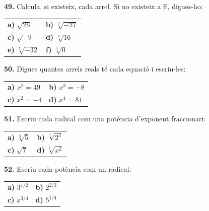 \documentclass[13pt,a4paper]{extarticle}
\begin{document}
\par\noindent\begin{minipage}{\linewidth}
\textbf{49.} Calcula, si existeix, cada arrel. Si no existeix a $\mathbb{R}$, digues-ho:\par

\begin{tabular}{@{}p{.46\linewidth}p{.46\linewidth}@{}}
\textbf{a)} $\sqrt{25}$ & \textbf{b)} $\sqrt[3]{-27}$ \\[2pt]
\textbf{c)} $\sqrt{-9}$ & \textbf{d)} $\sqrt[4]{16}$ \\[2pt]
\textbf{e)} $\sqrt[5]{-32}$ & \textbf{f)} $\sqrt[3]{0}$ \\[2pt]
\end{tabular}\par
\end{minipage}\par\vspace{1.6mm}
\par\noindent\begin{minipage}{\linewidth}
\textbf{50.} Digues quantes arrels reals té cada equació i escriu-les:\par

\begin{tabular}{@{}p{.46\linewidth}p{.46\linewidth}@{}}
\textbf{a)} $x^2=49$ & \textbf{b)} $x^3=-8$ \\[2pt]
\textbf{c)} $x^2=-4$ & \textbf{d)} $x^4=81$ \\[2pt]
\end{tabular}\par
\end{minipage}\par\vspace{1.6mm}
\par\noindent\begin{minipage}{\linewidth}
\textbf{51.} Escriu cada radical com una potència d'exponent fraccionari:\par

\begin{tabular}{@{}p{.46\linewidth}p{.46\linewidth}@{}}
\textbf{a)} $\sqrt[3]{5}$ & \textbf{b)} $\sqrt[4]{2^3}$ \\[2pt]
\textbf{c)} $\sqrt{7}$ & \textbf{d)} $\sqrt[5]{x^2}$ \\[2pt]
\end{tabular}\par
\end{minipage}\par\vspace{1.6mm}
\par\noindent\begin{minipage}{\linewidth}
\textbf{52.} Escriu cada potència com un radical:\par

\begin{tabular}{@{}p{.46\linewidth}p{.46\linewidth}@{}}
\textbf{a)} $3^{1/2}$ & \textbf{b)} $2^{2/3}$ \\[2pt]
\textbf{c)} $x^{3/4}$ & \textbf{d)} $5^{1/4}$ \\[2pt]
\end{tabular}\par
\end{minipage}\par\vspace{1.6mm}
\end{document}
